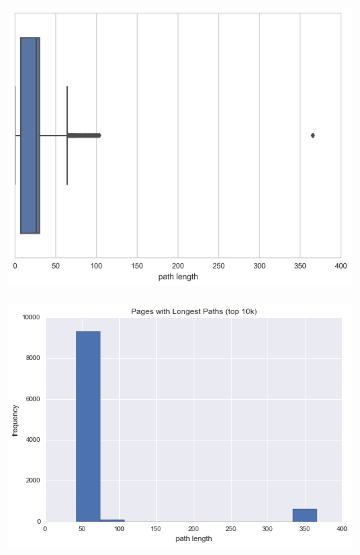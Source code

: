 \documentclass[twoside]{article}
\begin{document}
\begin{figure}[H]
\centering
    \caption{Path Length Distribution}
    \begin{subfigure}[b]{0.5\textwidth}
        \includegraphics[width=\textwidth]{graphics/path_lengths_boxplot.png}
    \end{subfigure}
\end{figure}
\begin{figure}[H]
\centering
    \caption{Longest Path Lengths}
    \begin{subfigure}[b]{0.5\textwidth}
        \includegraphics[width=\textwidth]{graphics/top_1k_path_length.png}
    \end{subfigure}
\end{figure}
\end{document}

